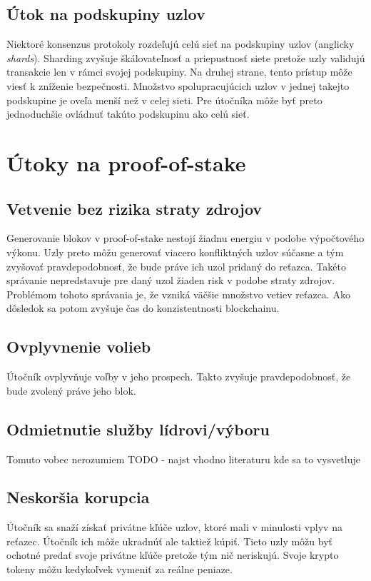 \subsection{Útok na podskupiny uzlov}

Niektoré konsenzus protokoly rozdeľujú celú sieť na podskupiny uzlov (anglicky \textit{shards}). Sharding zvyšuje škálovateľnosť a priepustnosť siete pretože uzly validujú transakcie len v rámci svojej podskupiny. Na druhej strane, tento prístup môže viesť k zníženie bezpečnosti. Množstvo spolupracujúcich uzlov v jednej takejto podskupine je oveľa menší než v celej sieti. Pre útočníka môže byť preto jednoduchšie ovládnuť takúto podskupinu ako celú sieť.

\section{Útoky na proof-of-stake}

\subsection{Vetvenie bez rizika straty zdrojov}
Generovanie blokov v proof-of-stake nestojí žiadnu energiu v podobe výpočtového výkonu. Uzly preto môžu generovať viacero konfliktných uzlov súčasne a tým zvyšovať pravdepodobnosť, že bude práve ich uzol pridaný do reťazca. Takéto správanie nepredstavuje pre daný uzol žiaden risk v podobe straty zdrojov. Problémom tohoto správania je, že vzniká väčšie množstvo vetiev reťazca. Ako dôsledok sa potom zvyšuje čas do konzistentnosti blockchainu.

\subsection{Ovplyvnenie volieb}
Útočník ovplyvňuje voľby v jeho prospech. Takto zvyšuje pravdepodobnosť, že bude zvolený práve jeho blok. 

\subsection{Odmietnutie služby lídrovi/výboru}

Tomuto vobec nerozumiem TODO - najst vhodno literaturu kde sa to vysvetluje

\subsection{Neskoršia korupcia}
Útočník sa snaží získať privátne kľúče uzlov, ktoré mali v minulosti vplyv na reťazec. Útočník ich môže ukradnúť ale taktiež kúpiť. Tieto uzly môžu byť ochotné predať svoje privátne kľúče pretože tým nič neriskujú. Svoje krypto tokeny môžu kedykoľvek vymeniť za reálne peniaze.

